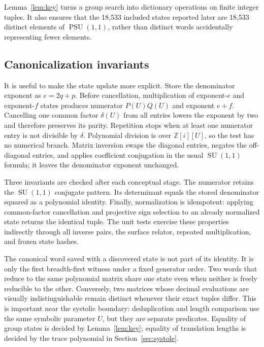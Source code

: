 \documentclass[11pt,a4paper]{article}
\theoremstyle{definition}
\newcommand{\Z}{\mathbb Z}
\newcommand{\PSU}{\operatorname{PSU}}
\newcommand{\SU}{\operatorname{SU}}
\begin{document}
Lemma~\ref{lem:key} turns a group search into dictionary operations on finite
integer tuples.  It also ensures that the 18,533 included states reported
later are 18,533 distinct elements of \(\PSU(1,1)\), rather than distinct
words accidentally representing fewer elements.

\subsection{Canonicalization invariants}

It is useful to make the state update more explicit.  Store the denominator
exponent as \(e=2q+p\).  Before cancellation, multiplication of exponent-\(e\)
and exponent-\(f\) states produces numerator \(P(U)Q(U)\) and exponent
\(e+f\).  Cancelling one common factor \(\delta(U)\) from all entries lowers
the exponent by two and therefore preserves its parity.  Repetition stops
when at least one numerator entry is not divisible by \(\delta\).  Polynomial
division is over \(\Z[i][U]\), so the test has no numerical branch.  Matrix
inversion swaps the diagonal entries, negates the off-diagonal entries, and
applies coefficient conjugation in the usual \(\SU(1,1)\) formula; it leaves
the denominator exponent unchanged.

Three invariants are checked after each conceptual stage.  The numerator
retains the \(\SU(1,1)\) conjugate pattern.  Its determinant equals the stored
denominator squared as a polynomial identity.  Finally, normalization is
idempotent: applying common-factor cancellation and projective sign selection
to an already normalized state returns the identical tuple.  The unit tests
exercise these properties indirectly through all inverse pairs, the surface
relator, repeated multiplication, and frozen state hashes.

The canonical word saved with a discovered state is not part of its identity.
It is only the first breadth-first witness under a fixed generator order.
Two words that reduce to the same polynomial matrix share one state even when
neither is freely reducible to the other.  Conversely, two matrices whose
decimal evaluations are visually indistinguishable remain distinct whenever
their exact tuples differ.  This is important near the systolic boundary:
deduplication and length comparison use the same symbolic parameter \(U\), but
they are separate predicates.  Equality of group states is decided by
Lemma~\ref{lem:key}; equality of translation lengths is decided by the trace
polynomial in Section~\ref{sec:systole}.
\end{document}
